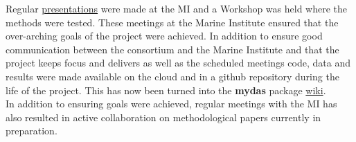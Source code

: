 

Regular \href{https://3o2y9wugzp1kfxr5hvzgzq-on.drv.tw/MyDas/presentations.html}{presentations} were made at the MI and a Workshop was held where the methods were tested. These meetings at the Marine Institute ensured that the over-arching goals of the project were achieved. In addition to ensure good communication between the consortium and the Marine Institute and that the project keeps focus and delivers as well as the scheduled meetings code, data and results were made available on the cloud and in a github repository during the life of the project. This has now been turned into the \textbf{mydas} package \href{https://github.com/flr/mydAS/wiki}{wiki}.\\
In addition to ensuring goals were achieved, regular meetings with the MI has also resulted in active collaboration on methodological papers currently in preparation.


